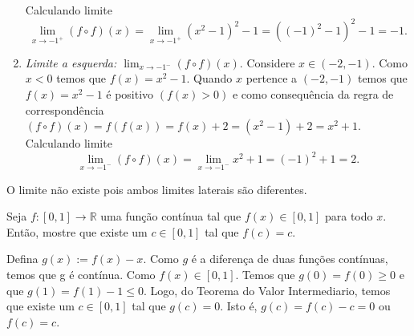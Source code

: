 \documentclass[11pt]{exam}
\begin{document}
\begin{questions}
\begin{solution}
\begin{enumerate}
         Calculando limite 
         $$ \lim_{x \rightarrow -1^{+}} (f \circ f)(x)=
         \lim_{x \rightarrow -1^{+}} (x^{2}-1)^{2}-1=((-1)^{2}-1)^{2}-1=-1. 
         $$
         \item {\it Limite a esquerda: 
         $\lim_{x \rightarrow -1^{-}} (f \circ f)(x)$}. Considere 
         $x \in (-2, -1)$. Como $x<0$ temos que   
         $f(x)=x^{2}-1$. Quando $x$ pertence a $(-2,-1)$ 
         temos que $f(x)=x^{2}-1$
         é positivo $(f(x)>0)$ e como consequência da regra 
         de correspondência 
          $(f \circ f)(x)=f(f(x))=f(x)+2=(x^{2}-1)+2=x^{2}+1$.
          Calculando limite 
         $$ \lim_{x \rightarrow -1^{-}} (f \circ f)(x)=
         \lim_{x \rightarrow -1^{-}} x^{2}+1=(-1)^{2}+1=2. 
         $$
         \end{enumerate}
       O limite não existe pois ambos limites laterais são diferentes.   
       \end{solution}
    \question [10] Seja $f:[0,1] \rightarrow \mathbb{R}$ uma função contínua tal que $f(x) \in [0,1]$ para todo $x$.
      Então, mostre que existe um $c \in [0,1]$ tal que $f(c)=c$.
        \begin{solution}
        Defina $g(x):=f(x)-x$. Como $g$ é a diferença de duas funções contínuas, temos que g é contínua. Como $f(x)\in [0,1]$. Temos que 
        $g(0)=f(0)\geq 0$ e que $g(1)=f(1)-1\leq 0$. Logo, do Teorema do Valor Intermediario, temos que existe um $c \in [0,1]$ tal que $g(c)=0$. Isto é,
        $ g(c)=f(c)-c=0$ ou $f(c)=c$.
    \end{solution}
 \end{questions}
\end{document}
